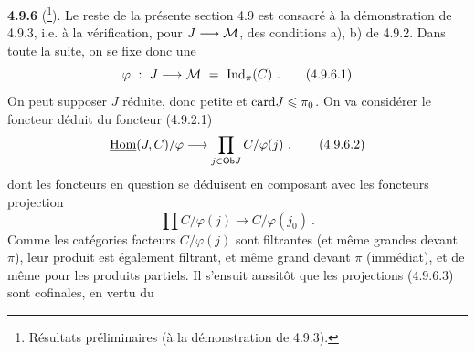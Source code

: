 
\textbf{4.9.6} (\footnote[96]{Résultats préliminaires (à la démonstration de 4.9.3).}). Le reste de la présente section 4.9 est consacré à la démonstration de 4.9.3, i.e. à la vérification, pour $J \longrightarrow \mathcal{M}$, des conditions a), b) de 4.9.2. Dans toute la suite, on se fixe donc une
\[
\varphi \ : \ J \longrightarrow \cM \ = \ \Ind_\pi(C) \ . \tag*{(4.9.6.1)}
\]
On peut supposer $J$ réduite, donc petite et $\mathrm{card} J \leqslant \pi_0$. On va considérer le foncteur déduit du foncteur (4.9.2.1)
\[
\uHom(J,C)/\varphi \longrightarrow \prod_{j \in \Ob J} C/\varphi(j) \ , \tag*{(4.9.6.2)}
\]
dont les foncteurs en question se déduisent en composant avec les foncteurs projection
\[
\prod C/\varphi(j) \longrightarrow C/\varphi(j_0) \ . \tag*{(4.9.6.3)}
\]
Comme les catégories facteurs $C/\varphi(j)$ sont filtrantes (et même grandes devant $\pi$), leur produit est également filtrant, et même grand devant $\pi$ (immédiat), et de même
pour les produits partiels. Il s'ensuit aussitôt que les projections (4.9.6.3) sont cofinales, en vertu du

